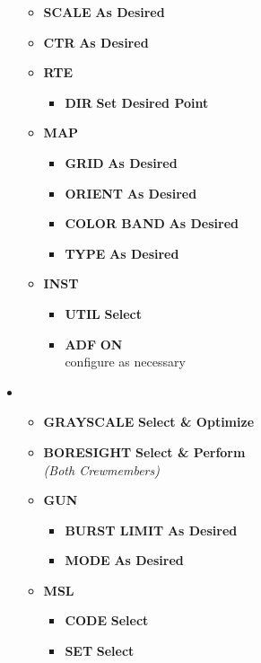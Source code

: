 \documentclass[fontHelvetica]{TechCheck}
\begin{document}
\begin{itemize}[leftmargin=0.1\linewidth,rightmargin=0.1\linewidth, itemsep=4pt]
\begin{itemize}[itemsep=4pt]
			\item \textbf{SCALE} \dotfill \textbf{As Desired}
			\item \textbf{CTR} \dotfill \textbf{As Desired}
			\item \textbf{RTE}
			\begin{itemize}[itemsep=4pt]
				\item \textbf{DIR} \dotfill \textbf{Set Desired Point}
			\end{itemize}
			\item \textbf{MAP}
			\begin{itemize}[itemsep=4pt]
				\item \textbf{GRID} \dotfill \textbf{As Desired}
				\item \textbf{ORIENT} \dotfill \textbf{As Desired}
				\item \textbf{COLOR BAND} \dotfill \textbf{As Desired}
				\item \textbf{TYPE} \dotfill \textbf{As Desired}
			\end{itemize}
			\item \textbf{INST}
			\begin{itemize}[itemsep=4pt]
				\item \textbf{UTIL} \dotfill \textbf{Select}
				\item \textbf{ADF} \dotfill \textbf{ON} \\
				\hfill configure as necessary
			\end{itemize}
		\end{itemize}
		\item {}
		\begin{itemize}[itemsep=4pt]
			\item \textbf{GRAYSCALE} \dotfill \textbf{Select \& Optimize}
			\item \textbf{BORESIGHT} \dotfill \textbf{Select \& Perform} \\
			\hfill \emph{(Both Crewmembers)}
			\item \textbf{GUN}
			\begin{itemize}[itemsep=4pt]
				\item \textbf{BURST LIMIT} \dotfill \textbf{As Desired}
				\item \textbf{MODE} \dotfill \textbf{As Desired}
			\end{itemize}
			\item \textbf{MSL}
			\begin{itemize}[itemsep=4pt]
				\item \textbf{CODE} \dotfill \textbf{Select}
				\item \textbf{SET} \dotfill \textbf{Select}

\end{itemize}
\end{itemize}
\end{itemize}
\end{document}
